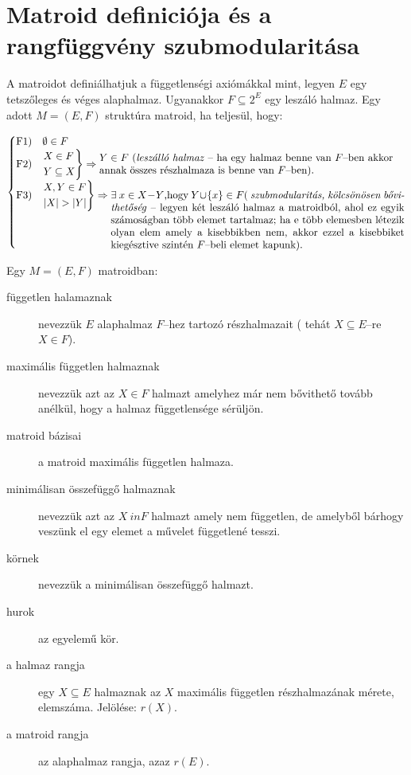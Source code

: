 \section{Matroid definiciója és a rangfüggvény szubmodularitása}

A matroidot definiálhatjuk a függetlenségi axiómákkal mint, legyen $E$ egy
tetszőleges és véges alaphalmaz. Ugyanakkor $F \subseteq  2^E$ egy leszáló
halmaz. Egy adott $M=(E,F)$ struktúra matroid, ha teljesül, hogy:

\[
\begin{cases}
\mbox{F1}) &\emptyset \in F \\
\mbox{F2}) &\begin{rcases}
X \in F \\ 
Y \subseteq X 
\end{rcases} \Rightarrow \parbox[L]{10cm}{$Y \in F$
(\emph{leszálló halmaz} -- ha egy halmaz benne van $F$--ben akkor annak összes
részhalmaza is benne van $F$--ben).
} \\
\mbox{F3}) &\begin{rcases}
X,Y \in F\\
|X| > |Y| \\
\end{rcases} \Rightarrow\parbox[t]{10cm}{ $\exists~x \in X-Y$,hogy $Y \cup \{x\}
\in F ($ \emph{szubmodularitás, kölcsönösen bővithetőség} -- legyen két leszáló
halmaz a matroidból, ahol ez egyik számoságban több elemet tartalmaz; ha e több
elemesben létezik olyan elem amely a kisebbikben nem, akkor ezzel a kisebbiket
kiegésztive szintén $F$--beli elemet kapunk).}
\end{cases}
\]

Egy $M=(E,F)$ matroidban: 

\begin{description}
  \item[független halamaznak] nevezzük $E$ alaphalmaz $F$--hez tartozó
  részhalmazait ( tehát $X\subseteq E$--re $X \in F$).
  \item[maximális független halmaznak] nevezzük azt az $X \in F$ halmazt
  amelyhez már nem bővithető tovább anélkül, hogy a halmaz függetlensége
  sérüljön.
  \item[matroid bázisai] a matroid maximális független halmaza.
  \item[minimálisan összefüggő halmaznak] nevezzük azt az $X \ in F$ halmazt
  amely nem független, de amelyből bárhogy veszünk el egy elemet a művelet
  függetlené tesszi.
  \item[körnek] nevezzük a minimálisan összefüggő halmazt.
  \item[hurok] az egyelemű kör. 
  \item[a halmaz rangja] egy $X\subseteq E$ halmaznak az $X$ maximális
  független részhalmazának mérete, elemszáma. Jelölése: $r(X)$.
  \item[a matroid rangja] az alaphalmaz rangja, azaz $r(E)$.
\end{description}

